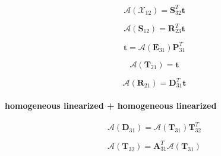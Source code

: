 \begin{equation}
\mathcal{A}(\mathcal{X}_{12}) = \mathbf{S}^{T}_{32}\mathbf{t}
\label{eq:adding-upward-adjoint_of_tangent_linear-homogeneous_linearized_p_particular_linearized-t12_a}
\end{equation}

\begin{equation}
\mathcal{A}(\mathbf{S}_{12}) = \mathbf{R}^{T}_{23}\mathbf{t}
\label{eq:adding-upward-adjoint_of_tangent_linear-homogeneous_linearized_p_particular_linearized-S12_a}
\end{equation}

\begin{equation}
\mathbf{t} = \mathcal{A}(\mathbf{E}_{31})\mathbf{P}^{T}_{31}
\label{eq:adding-upward-adjoint_of_tangent_linear-homogeneous_linearized_p_particular_linearized-t2}
\end{equation}

\begin{equation}
\mathcal{A}(\mathbf{T}_{21}) = \mathbf{t}
\label{eq:adding-upward-adjoint_of_tangent_linear-homogeneous_linearized_p_particular_linearized-T21_a}
\end{equation}

\begin{equation}
\mathcal{A}(\mathbf{R}_{21}) = \mathbf{D}^{T}_{31}\mathbf{t}
\label{eq:adding-upward-adjoint_of_tangent_linear-homogeneous_linearized_p_particular_linearized-R21_a}
\end{equation}


\paragraph{homogeneous linearized + homogeneous linearized}
\label{sec:adding-upward-adjoint_of_tangent_linear-homogeneous_linearized_p_homogeneous_linearized}

\begin{equation}
\mathcal{A}(\mathbf{D}_{31}) = \mathcal{A}(\mathbf{T}_{31})\mathbf{T}^{T}_{32}
\label{eq:adding-upward-adjoint_of_tangent_linear-homogeneous_linearized_p_homogeneous_linearized-D31_a}
\end{equation}

\begin{equation}
\mathcal{A}(\mathbf{T}_{32}) = \mathbf{A}^{T}_{31}\mathcal{A}(\mathbf{T}_{31})
\label{eq:adding-upward-adjoint_of_tangent_linear-homogeneous_linearized_p_homogeneous_linearized-T32_a}
\end{equation}

